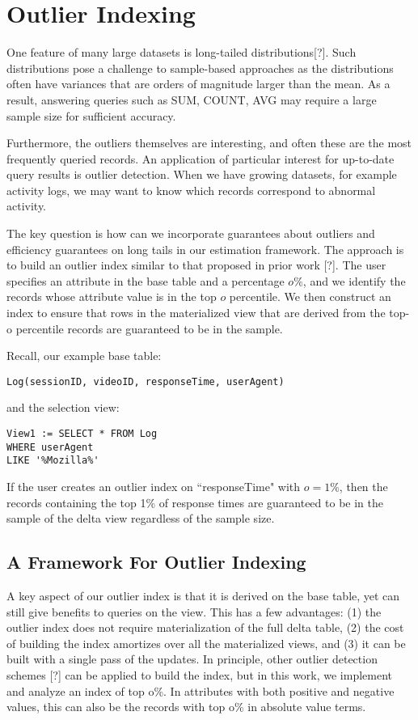 \section{Outlier Indexing}
One feature of many large datasets is long-tailed distributions[?].
Such distributions pose a challenge to sample-based approaches as the
distributions often have variances that are orders of magnitude larger
than the mean.
As a result, answering queries such as SUM, COUNT, AVG may require a large 
sample size for sufficient accuracy.

Furthermore, the outliers themselves are interesting, and often these are the
most frequently queried records.
An application of particular interest for up-to-date query results
is outlier detection. When we have growing datasets, for example activity
logs, we may want to know which records correspond to abnormal activity.

The key question is how can we incorporate guarantees about outliers
and efficiency guarantees on long tails in our estimation framework.
The approach is to build an outlier index similar to that proposed in prior work [?].
The user specifies an attribute in the base table and a percentage $o\%$, and we 
identify the records whose attribute value is in the top $o$ percentile.
We then construct an index to ensure that rows in the materialized view
that are derived from the top-o percentile records are guaranteed to be in the sample.

Recall, our example base table:
\begin{lstlisting}
Log(sessionID, videoID, responseTime, userAgent)
\end{lstlisting}
and the selection view:
\begin{lstlisting}
View1 := SELECT * FROM Log 
WHERE userAgent 
LIKE '%Mozilla%'
\end{lstlisting}
If the user creates an outlier index on ``responseTime" with $o=1\%$, then
the records containing the top 1\% of response times are guaranteed to be 
in the sample of the delta view regardless of the sample size.

\subsection{A Framework For Outlier Indexing}
A key aspect of our outlier index is that it is derived on the base table, yet 
can still give benefits to queries on the view.
This has a few advantages: (1) the outlier index does not require materialization of the full delta table,
(2) the cost of building the index amortizes over all the materialized views, and (3) it can be built with a 
single pass of the updates.
In principle, other outlier detection schemes [?] can be applied to build the index, but in this work, we 
implement and analyze an index of top o\%. 
In attributes with both positive and negative values, this can also be the records with top o\% in absolute value terms.

